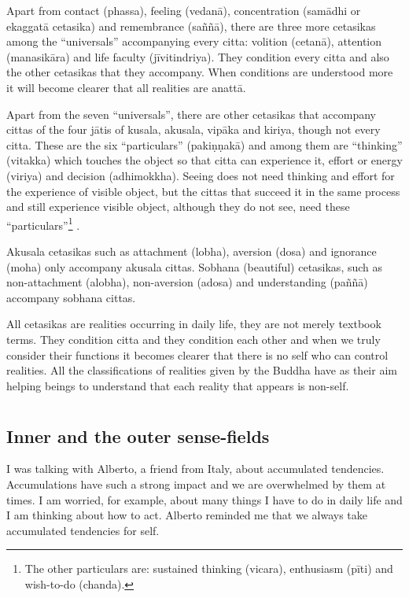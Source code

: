 Apart from contact (phassa), feeling (vedanā), concentration (samādhi or
ekaggatā cetasika) and remembrance (saññā), there are three more
cetasikas among the ``universals'' accompanying every citta: volition
(cetanā), attention (manasikāra) and life faculty (jīvitindriya). They
condition every citta and also the other cetasikas that they accompany.
When conditions are understood more it will become clearer that all
realities are anattā.

Apart from the seven ``universals'', there are other cetasikas that
accompany cittas of the four jātis of kusala, akusala, vipāka and
kiriya, though not every citta. These are the six ``particulars''
(pakiṇṇakā) and among them are ``thinking'' (vitakka) which touches the
object so that citta can experience it, effort or energy (viriya) and
decision (adhimokkha). Seeing does not need thinking and effort for the
experience of visible object, but the cittas that succeed it in the same
process and still experience visible object, although they do not see,
need these ``particulars''\footnote{The other particulars
are: sustained thinking (vicara), enthusiasm (pīti) and wish-to-do
(chanda).} .

Akusala cetasikas such as attachment (lobha), aversion (dosa) and
ignorance (moha) only accompany akusala cittas. Sobhana (beautiful)
cetasikas, such as non-attachment (alobha), non-aversion (adosa) and
understanding (paññā) accompany sobhana cittas.

All cetasikas are realities occurring in daily life, they are not merely
textbook terms. They condition citta and they condition each other and
when we truly consider their functions it becomes clearer that there is
no self who can control realities. All the classifications of realities
given by the Buddha have as their aim helping beings to understand that
each reality that appears is non-self.


\chapter[Inner and the outer sense-fields]{}
\section*{Inner and the outer sense-fields}

I was talking with Alberto, a friend from Italy, about accumulated
tendencies. Accumulations have such a strong impact and we are
overwhelmed by them at times. I am worried, for example, about many
things I have to do in daily life and I am thinking about how to act.
Alberto reminded me that we always take accumulated tendencies for self.

